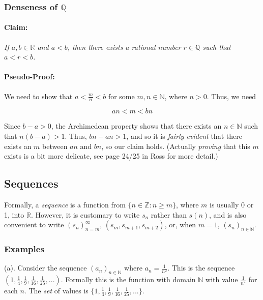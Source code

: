 \documentclass[]{article}
\begin{document}
\subsubsection{Denseness of $\mathbb{Q}$}

\paragraph{Claim:}

\emph{If $a,b \in \mathbb{R}$ and $a<b$, then there exists a rational
number $r \in \mathbb{Q}$ such that $a < r < b$.}

\paragraph{Pseudo-Proof:}

We need to show that $a < \frac{m}{n} < b$ for some
$m,n \in \mathbb{N}$, where $n > 0$. Thus, we need

\[ an < m < bn \]

Since $b-a > 0$, the Archimedean property shows that there exists an
$n \in \mathbb{N}$ such that $n(b-a) > 1$. Thus, $bn - an > 1$, and so
it is \emph{fairly evident} that there exists an $m$ between $an$ and
$bn$, so our claim holds. (Actually \emph{proving} that this $m$ exists
is a bit more delicate, see page 24/25 in Ross for more detail.)

\subsection{Sequences}

Formally, a \emph{sequence} is a function from
$\{ n \in \mathbb{Z}: n \ge m\}$, where $m$ is usually 0 or 1, into
$\mathbb{R}$. However, it is customary to write $s_n$ rather than
$s(n)$, and is also convenient to write $(s_n)_{n=m}^{\infty}$,
$(s_m, s_{m+1}, s_{m+2})$, or, when $m = 1$, $(s_n)_{n \in \mathbb{N}}$.

\subsubsection{Examples}

(a). Consider the sequence $(a_n)_{n \in \mathbb{N}}$ where
$a_n = \frac{1}{n^2}$. This is the sequence
$(1, \frac{1}{4}, \frac{1}{9}, \frac{1}{16}, \frac{1}{25}, ...)$.
Formally this is the function with domain $\mathbb{N}$ with value
$\frac{1}{n^2}$ for each $n$. The \emph{set} of values is
$\{1, \frac{1}{4}, \frac{1}{9}, \frac{1}{16}, \frac{1}{25}, ...\}$.
\end{document}
